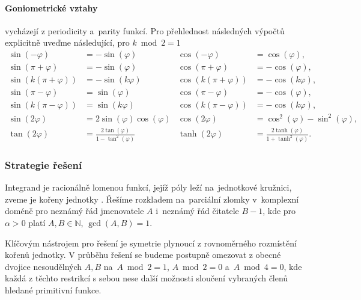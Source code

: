 \paragraph{Goniometrické vztahy} vycházejí z periodicity a~parity funkcí. Pro přehlednost následných výpočtů explicitně uveďme následující, pro $k\bmod2=1$
\begin{subequations}
\begin{align}
    \sin(-\varphi)&=-\sin(\varphi) & \cos(-\varphi) &= \cos(\varphi),\label{eq:cis_negative}\\
    \sin(\pi+\varphi)&=-\sin(\varphi) & \cos(\pi+\varphi) &= -\cos(\varphi),\label{eq:cis_pi_shift}\\
    \sin(k(\pi+\varphi))&=-\sin(k\varphi) & \cos(k(\pi+\varphi)) &= -\cos(k\varphi),\label{eq:cs_kpi_shift}\\
    \sin(\pi-\varphi)&=\sin(\varphi) & \cos(\pi-\varphi)&=-\cos(\varphi),\label{eq:cis_pi_negative}\\
    \sin(k(\pi-\varphi))&=\sin(k\varphi) & \cos(k(\pi-\varphi))&=-\cos(k\varphi),\label{eq:cis_kpi_negative}\\
    \sin(2\varphi)&= 2\sin(\varphi)\cos(\varphi)&\cos(2\varphi)&=\cos^2(\varphi)-\sin^2(\varphi),\label{eq:cis_double}\\
    \tan(2\varphi)&=\frac{2\tan(\varphi)}{1-\tan^2(\varphi)}&\tanh(2\varphi)&=\frac{2\tanh(\varphi)}{1+\tanh^2(\varphi)}.\label{eq:tan_tanh_double}
\end{align}
\end{subequations}


\subsubsection{Strategie řešení}\label{sss:strategie_reseni}
Integrand je racionálně lomenou funkcí, jejíž póly leží na~jednotkové kružnici, zveme je kořeny jednotky . Řešíme rozkladem na~parciální zlomky v~komplexní doméně pro neznámý řád jmenovatele $A$ i~neznámý řád čitatele $B-1$, kde pro $\alpha>0$ platí $A,B\in\mathbb{N}$, $\gcd(A,B)=1$. 

Klíčovým nástrojem pro řešení je symetrie plynoucí z rovnoměrného rozmístění kořenů jednotky. V průběhu řešení se budeme postupně omezovat z obecné dvojice nesoudělných $A, B$ na~$A\bmod 2=1$, $A\bmod 2=0$ a~$A\bmod 4 = 0$, kde každá z těchto restrikcí s sebou nese další možnosti sloučení vybraných členů hledané primitivní funkce.

